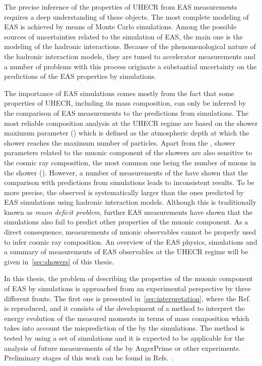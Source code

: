 The precise inference of the properties of UHECR
from EAS measurements requires a deep understanding
of these objects. The most complete modeling of EAS is
achieved by means of Monte Carlo simulations.
Among the possible sources of uncertainties related to the
simulation of EAS, the main one is the modeling
of the hadronic interactions. 
Because of the phenomenological nature of the hadronic interaction models,
they are tuned to accelerator measurements
and a number of problems with this process originate a substantial
uncertainty on the predictions of the EAS properties by simulations.

The importance of EAS simulations comes mostly from the fact that
some properties of UHECR, including its mass composition,
can only be inferred by the comparison of EAS measurements
to the predictions from simulations.
The most reliable composition analysis at the UHECR regime
are based on the shower maximum parameter (\xmax) which is defined
as the atmospheric depth at which the shower reaches the maximum
number of particles. Apart from the \xmax, shower parameters related
to the muonic component of the showers are also sensitive to
the cosmic ray composition, the most common one being the number
of muons in the shower (\nmu). However, a number of measurements of the \nmu
have shown that the comparison with predictions from simulations leads
to inconsistent results. To be more precise, the \nmu observed is systematically
larger than the ones predicted by EAS simulations using hadronic interaction
models. Although this is traditionally known as \emph{muon deficit problem},
further EAS measurements have shown
that the simulations also fail to predict other properties of the muonic component.
As a direct consequence, measurements of muonic observables cannot be
properly used to infer cosmic ray composition.  
An overview of the EAS physics, simulations and a summary of measurements
of EAS observables at the UHECR regime will be given in~\cref{sec:showers}
of this thesis. \newline

In this thesis, the problem of describing the properties of the muonic component of EAS
by simulations is approached from an experimental perspective by three different fronts.
The first one is presented in~\cref{sec:interpretation},
where the Ref.~\cite{Prado:2016akv} is reproduced,
and it consists of the development of a method to interpret the energy evolution
of the measured \nmu moments in terms of mass composition which takes into account
the misprediction of the \nmu by the simulations. The method is tested by using
a set of simulations and it is expected to be applicable for the analysis
of future measurements of the \nmu by AugerPrime or other experiments.
Preliminary stages of this work can be found in Refs.~\cite{Prado:2015iaz,GAP2014,GAP2015}.

